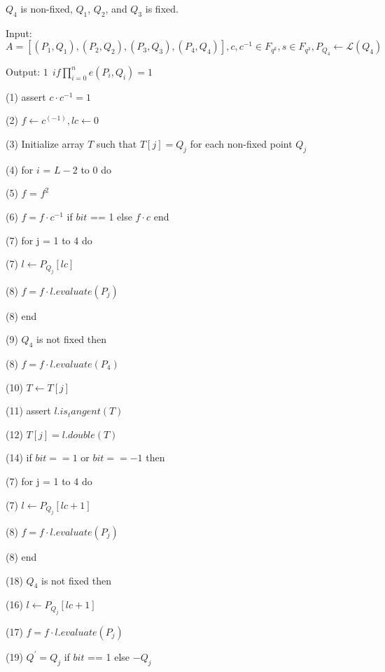 $Q_4$ is non-fixed, $Q_1$, $Q_2$, and $Q_3$ is fixed.


Input: $\displaystyle A = [(P_1,Q_1), (P_2,Q_2), (P_3,Q_3),(P_4,Q_4)],c, c^{-1} \in F_{q^k},s \in F_{q^3},P_{Q_4} \leftarrow \mathcal{L}(Q_4)$ 

Output: $\displaystyle 1 \ \ if \prod_{i=0}^{n}e(P_i, Q_i) = 1 $ 

(1) assert $\displaystyle c \cdot c^{-1} = 1 $ 

(2) $\displaystyle f \leftarrow c^(-1), lc \leftarrow 0 $ 

(3) Initialize array $T$ such that $\displaystyle T[j] = Q_j $ for each non-fixed point $Q_j$ 

(4) for $i$ = $L-2$ to $0$ do 

(5) \indent $f$ = $f^2$ 

(6) \indent \indent $\displaystyle f = f \cdot c^{-1}$ if $bit$ == 1 else $\displaystyle f \cdot c$ end 

(7) \indent for j = 1 to 4 do 

(7) \indent \indent $\displaystyle l \leftarrow P_{Q_j}[lc] $ 

(8) \indent \indent $\displaystyle f = f \cdot l.evaluate(P_j) $  

(8) \indent end 

(9) \indent $Q_4$ is not fixed then 

(8) \indent $\displaystyle f = f \cdot l.evaluate(P_4) $  

(10) \indent $\displaystyle T \leftarrow T[j] $ 

(11) \indent assert $\displaystyle l.is_tangent(T) $ 

(12) \indent $\displaystyle T[j] = l.double(T) $ 

(14) \indent if $bit == 1$ or $bit == -1 $ then 

(7) \indent \indent for j = 1 to 4 do 

(7) \indent \indent \indent $\displaystyle l \leftarrow P_{Q_j}[lc + 1] $ 

(8) \indent \indent \indent $\displaystyle f = f \cdot l.evaluate(P_j) $  

(8) \indent \indent end 

(18) \indent \indent $Q_4$ is not fixed then 

(16) \indent \indent  $\displaystyle l \leftarrow P_{Q_j}[lc+1] $ 

(17) \indent \indent  $\displaystyle f = f \cdot l.evaluate(P_{j})$ 

(19) \indent \indent  $\displaystyle Q^{'} = Q_j $ if $bit$ == 1 else $\displaystyle -Q_j $ 

